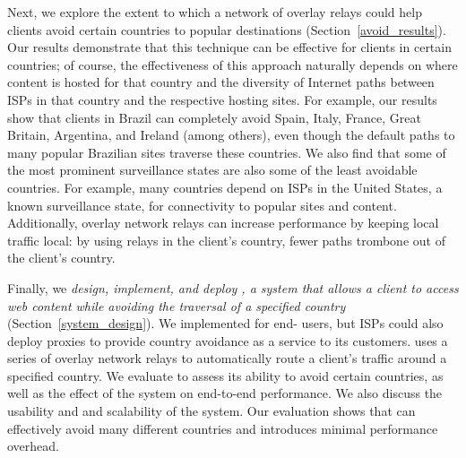 Next, we {explore the extent to which a network of overlay relays could help
clients avoid certain countries to popular destinations}
(Section~\ref{avoid_results}). Our results demonstrate that this technique can
be effective for clients in certain countries; of course, the effectiveness of
this approach naturally depends on where content is hosted for that country
and the diversity of Internet paths between ISPs in that country and the
respective hosting sites. For example, our results show that clients in Brazil
can completely avoid Spain, Italy, France, Great Britain, Argentina, and
Ireland (among others), even though the default paths to many popular
Brazilian sites traverse these countries. We also find that some of the most
prominent surveillance states are also some of the least avoidable countries.
For example, many countries depend on ISPs in the United States, a known
surveillance state, for connectivity to popular sites and content.
Additionally, overlay network relays can increase performance by keeping local
traffic local: by using relays in the client's country, fewer paths trombone
out of the client's country.

Finally, we {\em design, implement, and deploy \system{}, a system that allows
a client to access web content while avoiding the traversal of a specified
country} (Section~\ref{system_design}).  We implemented \system{} for end-
users, but ISPs could also deploy \system{} proxies to provide country
avoidance as a service to its customers.  \system{} uses a series of overlay
network relays to automatically route a client's traffic around a specified
country.  We evaluate \system{} to assess its ability to avoid certain
countries, as well as the effect of the system on end-to-end performance. We
also discuss the usability and and scalability of the system.  Our evaluation
shows that \system{} can effectively avoid many different countries and
introduces minimal performance overhead. 